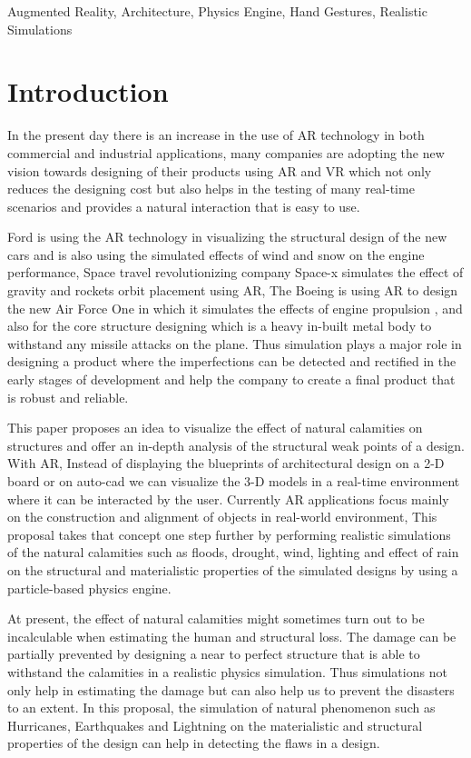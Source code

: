 \documentclass[conference]{IEEEtran}
\begin{document}
\begin{IEEEkeywords}
	Augmented Reality, Architecture, Physics Engine, Hand Gestures, Realistic Simulations
\end{IEEEkeywords}

\section{Introduction}
In the present day there is an increase in the use of AR technology in both commercial and industrial applications, many companies are adopting the new vision towards designing of their products using AR and VR which not only reduces the designing cost but also helps in the testing of many real-time scenarios and provides a natural interaction that is easy to use.

Ford is using the AR technology in visualizing the structural design of the new cars and is also using the simulated effects of wind and snow on 
the engine performance, Space travel revolutionizing company Space-x simulates the effect of gravity and rockets orbit placement using AR, 
The Boeing is using AR to design the new Air Force One in which it simulates the effects of engine propulsion , and also for the core structure designing which is a heavy in-built metal body to withstand any missile attacks on the plane. Thus simulation plays a major role in designing a product where the imperfections can be detected and rectified in the early stages of development and help the company to create a final product that is robust and reliable.

This paper proposes an idea to visualize the effect of natural calamities on structures and offer an in-depth analysis of the structural weak points of a design. With AR, Instead of displaying the blueprints of architectural design on a 2-D board or on auto-cad we can visualize the 3-D models in a real-time environment where it can be interacted by the user. Currently AR applications focus mainly on the construction and alignment of objects in real-world environment, This proposal takes that concept one step further by performing realistic simulations of the natural calamities such as floods,  drought, wind, lighting and effect of rain on the structural and materialistic properties of the simulated designs by using a particle-based physics engine. 

At present, the effect of natural calamities might sometimes turn out to be incalculable when estimating the human and structural loss. The damage can be partially prevented by designing a near to perfect structure that is able to withstand the calamities in a realistic physics simulation. Thus simulations not only help in estimating the damage but can also help us to prevent the disasters to an extent. In this proposal, the simulation of natural phenomenon such as Hurricanes, Earthquakes and Lightning on the materialistic and structural properties of the design can help in detecting the flaws in a design.
\end{document}
